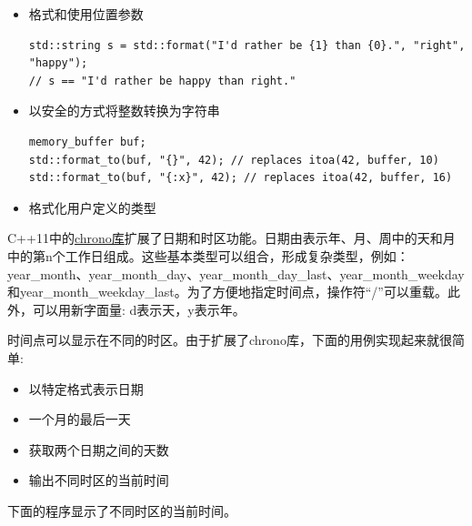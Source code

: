 \begin{itemize}
\item 
格式和使用位置参数

\begin{lstlisting}[style=styleCXX]
std::string s = std::format("I'd rather be {1} than {0}.", "right", "happy");
// s == "I'd rather be happy than right."
\end{lstlisting}

\item 
以安全的方式将整数转换为字符串

\begin{lstlisting}[style=styleCXX]
memory_buffer buf;
std::format_to(buf, "{}", 42); // replaces itoa(42, buffer, 10)
std::format_to(buf, "{:x}", 42); // replaces itoa(42, buffer, 16)
\end{lstlisting}

\item 
格式化用户定义的类型

\end{itemize}


C++11中的\href{https://en.cppreference.com/w/cpp/chrono}{chrono库}扩展了日期和时区功能。日期由表示年、月、周中的天和月中的第n个工作日组成。这些基本类型可以组合，形成复杂类型，例如：year\_month、year\_month\_day、year\_month\_day\_last、year\_month\_weekday和year\_month\_weekday\_last。为了方便地指定时间点，操作符“/”可以重载。此外，可以用新字面量: d表示天，y表示年。

时间点可以显示在不同的时区。由于扩展了chrono库，下面的用例实现起来就很简单:

\begin{itemize}
\item 
以特定格式表示日期

\item 
一个月的最后一天

\item 
获取两个日期之间的天数

\item 
输出不同时区的当前时间
\end{itemize}

下面的程序显示了不同时区的当前时间。

